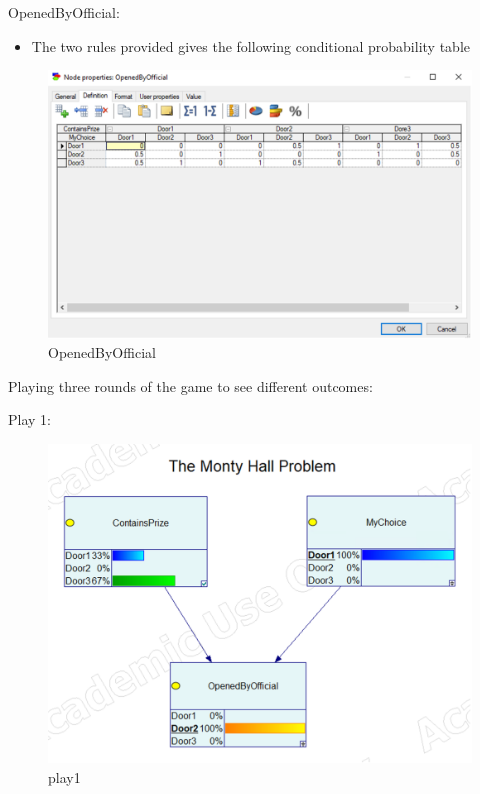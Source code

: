 \documentclass{article}
\begin{document}
\newpage

OpenedByOfficial:

\begin{itemize}
    \item The two rules provided gives the following conditional probability table
\end{itemize}

\begin{figure}[hbtp]
    \centering
    \includegraphics[width=\linewidth]{images/openedbyofficial.png}
    \caption{OpenedByOfficial}
    \label{fig:image3}
\end{figure}

\newpage

Playing three rounds of the game to see different outcomes:

Play 1:

\begin{figure}[hbtp]
    \centering
    \includegraphics[width=\linewidth]{images/play1.png}
    \caption{play1}
    \label{fig:image4}
\end{figure}
\end{document}

